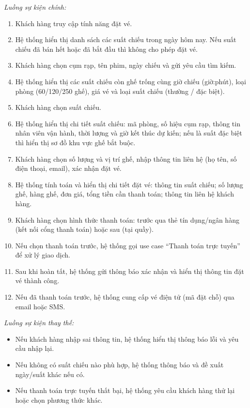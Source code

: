 \documentclass[11pt,a4paper]{article}
\begin{document}
\par\nobreak\vspace*{0pt}
{\itshape\nobreak Luồng sự kiện chính:}
\begin{enumerate}[leftmargin=1.05cm]
\item Khách hàng truy cập tính năng đặt vé.
\item Hệ thống hiển thị danh sách các suất chiếu trong ngày hôm nay. Nếu suất chiếu đã bán hết hoặc đã bắt đầu thì không cho phép đặt vé.
\item Khách hàng chọn cụm rạp, tên phim, ngày chiếu và gửi yêu cầu tìm kiếm.
\item Hệ thống hiển thị các suất chiếu còn ghế trống cùng giờ chiếu (giờ:phút), loại phòng (60/120/250 ghế), giá vé và loại suất chiếu (thường / đặc biệt).
\item Khách hàng chọn suất chiếu.
\item Hệ thống hiển thị chi tiết suất chiếu: mã phòng, số hiệu cụm rạp, thông tin nhân viên vận hành, thời lượng và giờ kết thúc dự kiến; nếu là suất đặc biệt thì hiển thị sơ đồ khu vực ghế bắt buộc.
\item Khách hàng chọn số lượng và vị trí ghế, nhập thông tin liên hệ (họ tên, số điện thoại, email), xác nhận đặt vé.
\item Hệ thống tính toán và hiển thị chi tiết đặt vé: thông tin suất chiếu; số lượng ghế, hàng ghế, đơn giá, tổng tiền cần thanh toán; thông tin liên hệ khách hàng.
\item Khách hàng chọn hình thức thanh toán: trước qua thẻ tín dụng/ngân hàng (kết nối cổng thanh toán) hoặc sau (tại quầy).
\item Nếu chọn thanh toán trước, hệ thống gọi use case ``Thanh toán trực tuyến'' để xử lý giao dịch.
\item Sau khi hoàn tất, hệ thống gửi thông báo xác nhận và hiển thị thông tin đặt vé thành công.
\item Nếu đã thanh toán trước, hệ thống cung cấp vé điện tử (mã đặt chỗ) qua email hoặc SMS.
\end{enumerate}
\par\nobreak\vspace{0pt}
{\itshape\nobreak Luồng sự kiện thay thế:}
\begin{itemize}[leftmargin=1.05cm]
\item Nếu khách hàng nhập sai thông tin, hệ thống hiển thị thông báo lỗi và yêu cầu nhập lại.
\item Nếu không có suất chiếu nào phù hợp, hệ thống thông báo và đề xuất ngày/suất khác nếu có.
\item Nếu thanh toán trực tuyến thất bại, hệ thống yêu cầu khách hàng thử lại hoặc chọn phương thức khác.
\end{itemize}
\end{document}
